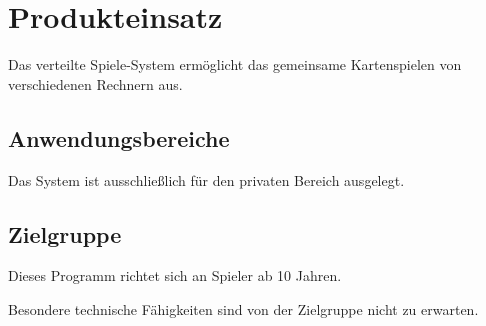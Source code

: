 \chapter{Produkteinsatz}

	Das verteilte Spiele-System ermöglicht das gemeinsame Kartenspielen von verschiedenen Rechnern aus.

	\section{Anwendungsbereiche}

		Das System ist ausschließlich für den privaten Bereich ausgelegt.

	\section{Zielgruppe}
	Dieses Programm richtet sich an Spieler ab 10 Jahren.
	 
	
	Besondere technische Fähigkeiten sind von der Zielgruppe nicht zu erwarten.
